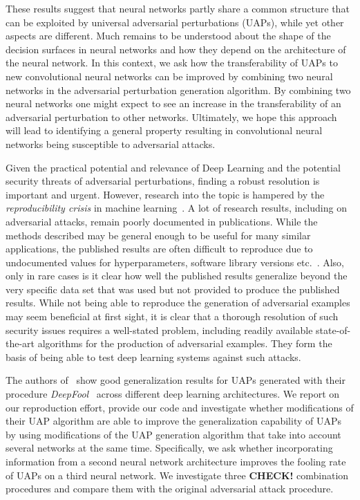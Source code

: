 \documentclass[runningheads]{llncs}
\begin{document}
These results suggest that neural networks partly share a common structure that can be exploited by universal adversarial perturbations (UAPs), while yet other aspects are different. Much remains to be understood about the shape of the decision surfaces in neural networks and how they depend on the architecture of the neural network. In this context, we ask how the transferability of UAPs to new convolutional neural networks can be improved by combining two neural networks in the adversarial perturbation generation algorithm. By combining two neural networks one might expect to see an increase in the transferability of an adversarial perturbation to other networks. Ultimately, we hope this approach will lead to identifying a general property resulting in convolutional neural networks being susceptible to adversarial attacks.

Given the practical potential and relevance of Deep Learning and the potential security threats of adversarial perturbations, finding a robust resolution is important and urgent. However, research into the topic is hampered by the \emph{reproducibility crisis} in machine learning~\cite{raff2020quantifying}. A lot of research results, including on adversarial attacks, remain poorly documented in publications. While the methods described may be general enough to be useful for many similar applications, 
the published results are often difficult to reproduce due to undocumented values for hyperparameters, software library versions etc.~\cite{Gundersen2018StateOT}. %
Also, only in rare cases is it clear how well the published results generalize beyond the very specific data set that was used but not provided to produce the published results. While not being able to reproduce the generation of adversarial examples may seem beneficial at first sight, it is clear that a thorough resolution of such security issues requires a well-stated problem, including readily available state-of-the-art algorithms for the production of adversarial examples. They form the basis of being able to test deep learning systems against such attacks. 

The authors of~\cite{moosavidezfooli_universal_2017,moosavi-dezfooli_deepfool_2016} show good generalization results for UAPs generated with their procedure \emph{DeepFool}~\cite{moosavi-dezfooli_deepfool_2016} across different deep learning architectures. We report on our reproduction effort, provide our code and investigate whether modifications of their UAP algorithm are able to improve the generalization capability of UAPs by using modifications of the UAP generation algorithm that take into account several networks at the same time. Specifically, we ask whether incorporating information from a second neural network architecture improves the fooling rate of UAPs on a third neural network. We investigate three {\bf CHECK!} combination procedures and compare them with the original adversarial attack procedure.
\end{document}
